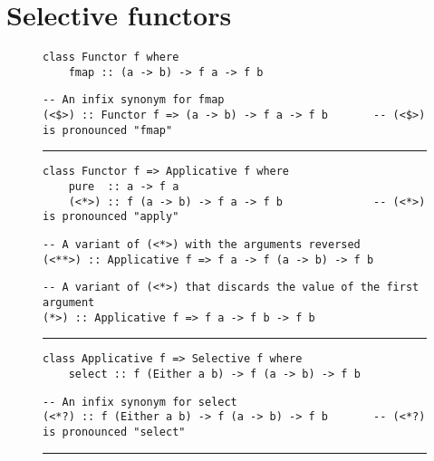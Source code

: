 \section{Selective functors}\label{sec-selective}

\begin{figure}
\begin{verbatim}
class Functor f where
    fmap :: (a -> b) -> f a -> f b
\end{verbatim}
\vspace{0.5mm}
\begin{verbatim}
-- An infix synonym for fmap
(<$>) :: Functor f => (a -> b) -> f a -> f b       -- (<$>) is pronounced "fmap"
\end{verbatim}
\vspace{2mm}
\hrule
\vspace{2mm}
\begin{verbatim}
class Functor f => Applicative f where
    pure  :: a -> f a
    (<*>) :: f (a -> b) -> f a -> f b              -- (<*>) is pronounced "apply"
\end{verbatim}
\vspace{0.5mm}
\begin{verbatim}
-- A variant of (<*>) with the arguments reversed
(<**>) :: Applicative f => f a -> f (a -> b) -> f b
\end{verbatim}
\vspace{0.5mm}
\begin{verbatim}
-- A variant of (<*>) that discards the value of the first argument
(*>) :: Applicative f => f a -> f b -> f b
\end{verbatim}
\vspace{2mm}
\hrule
\vspace{2mm}
\begin{verbatim}
class Applicative f => Selective f where
    select :: f (Either a b) -> f (a -> b) -> f b
\end{verbatim}
\vspace{0.5mm}
\begin{verbatim}
-- An infix synonym for select
(<*?) :: f (Either a b) -> f (a -> b) -> f b       -- (<*?) is pronounced "select"
\end{verbatim}
\vspace{2mm}
\hrule
\vspace{2mm}
\begin{verbatim}

\end{verbatim}
\end{figure}
